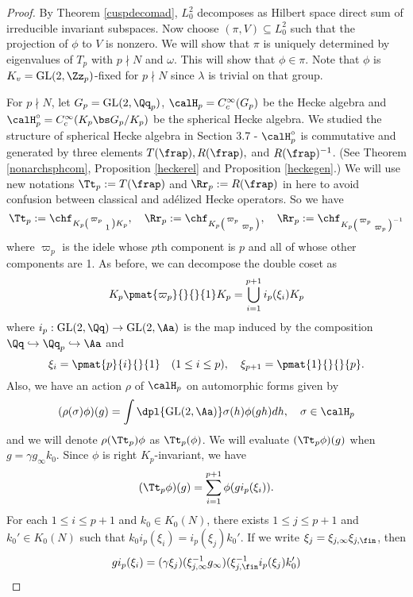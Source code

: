 \begin{proof}
By Theorem \ref{cuspdecomad}, $L^{2}_{0}$ decomposes as Hilbert space direct sum of irreducible invariant subspaces. Now choose $(\pi, V) \subseteq L_{0}^{2}$ such that the projection of $\phi$ to $V$ is nonzero. We will show that $\pi$ is uniquely determined by eigenvalues of $T_{p}$ with $p\nmid N$ and $\omega$. 
This will show that $\phi \in \pi$. Note that $\phi$ is $K_{v} = \GL(2, \Zz_{p})$-fixed for $p\nmid N$ since $\lambda$ is trivial on that group. 

For $p\nmid N$, let $G_{p} = \GL(2, \Qq_{p})$, $\calH_{p} =C_{c}^{\infty}(G_p)$ be the Hecke algebra and $\calH_{p}^{\circ} = C_{c}^{\infty}(K_{p} \bs G_{p} / K_p)$ be the spherical Hecke algebra. 
We studied the structure of spherical Hecke algebra in Section 3.7 - $\calH_p^{\circ}$ is commutative and generated by three elements $T(\frap), R(\frap),$ and $R(\frap)^{-1}$. (See Theorem \ref{nonarchsphcom}, Proposition \ref{heckerel} and Proposition \ref{heckegen}.) 
We will use new notations $\Tt_{p} := T(\frap)$ and $\Rr_{p} := R(\frap)$ in here to avoid confusion between classical and ad\'elized Hecke operators. 
So we have
$$
\Tt_{p} := \chf_{K_{p} \smat{\varpi_p}{}{}{1} K_{p}}, \quad \Rr_{p} := \chf_{K_{p} \smat{\varpi_{p}}{}{}{\varpi_{p}}}, \quad \Rr_{p} := \chf_{K_{p} \smat{\varpi_{p}}{}{}{\varpi_p}^{-1}}
$$
where $\varpi_{p}$ is the idele whose $p$th component is $p$ and all of whose other components are 1. 
As before, we can decompose the double coset as
$$
K_{p} \pmat{\varpi_p}{}{}{1} K_{p} = \bigcup_{i=1}^{p+1} i_{p}(\xi_{i})K_p
$$ 
where $i_{p}: \GL(2, \Qq) \to \GL(2, \Aa)$ is the map induced by the composition $\Qq\hookrightarrow \Qq_p \hookrightarrow \Aa$ and 
$$
\xi_{i} = \pmat{p}{i}{}{1} \quad (1\leq i\leq p), \quad \xi_{p+1} = \pmat{1}{}{}{p}.
$$
Also, we have an action $\rho$ of $\calH_{p}$ on automorphic forms given by 
$$
(\rho(\sigma)\phi)(g) = \int\dpl{\GL(2, \Aa)} \sigma(h)\phi(gh)dh, \quad \sigma\in \calH_p
$$
and we will denote $\rho(\Tt_{p})\phi$ as $\Tt_{p}(\phi)$. We will evaluate $(\Tt_{p}\phi)(g)$ when $g = \gamma g_{\infty} k_{0}$.  
Since $\phi$ is right $K_{p}$-invariant, we have
$$
(\Tt_{p}\phi)(g) = \sum_{i=1}^{p+1} \phi(gi_{p}(\xi_{i})).
$$
For each $1\leq i\leq p+1$ and $k_{0} \in K_{0}(N)$, there exists $1\leq j\leq p+1$ and $k_{0}'\in K_{0}(N)$ such that $k_{0}i_{p}(\xi_{i}) = i_{p}(\xi_{j})k_{0}'$. If we write $\xi_{j} = \xi_{j, \infty}\xi_{j, \fin}$, then 
$$
gi_{p}(\xi_{i}) = (\gamma\xi_{j}) (\xi_{j, \infty}^{-1}g_{\infty}) (\xi_{j, \fin}^{-1}i_{p}(\xi_{j})k_{0}')
$$

\end{proof}
